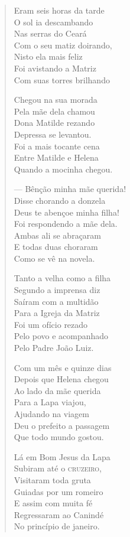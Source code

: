 \begin{verse}
Eram seis horas da tarde \\
O sol ia descambando \\
Nas serras do Ceará \\
Com o seu matiz doirando, \\
Nisto ela mais feliz \\
Foi avistando a Matriz \\
Com suas torres brilhando 


Chegou na sua morada \\
Pela mãe dela chamou \\
Dona Matilde rezando \\
Depressa se levantou. \\
Foi a mais tocante cena \\
Entre Matilde e Helena \\
Quando a mocinha chegou. 

--- Bênção minha mãe querida! \\
Disse chorando a donzela \\
Deus te abençoe minha filha! \\
Foi respondendo a mãe dela. \\
Ambas ali se abraçaram \\
E todas duas choraram \\
Como se vê na novela. 

Tanto a velha como a filha \\
Segundo a imprensa diz \\
Saíram com a multidão \\
Para a Igreja da Matriz \\
Foi um ofício rezado \\
Pelo povo e acompanhado \\
Pelo Padre João Luiz. 

Com um mês e quinze dias \\
Depois que Helena chegou \\
Ao lado da mãe querida \\
Para a Lapa viajou, \\
Ajudando na viagem \\
Deu o prefeito a passagem \\
Que todo mundo gostou. 


Lá em Bom Jesus da Lapa \\
Subiram até o \textsc{cruzeiro}, \\
Visitaram toda gruta \\
Guiadas por um romeiro \\
E assim com muita fé \\
Regressaram ao Canindé \\
No princípio de janeiro. 


\end{verse}
